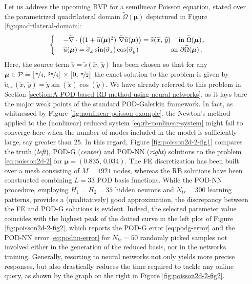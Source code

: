 \documentclass[12pt, a4paper, twoside, openright]{report}
\numberwithin{equation}{chapter}
\theoremstyle{theorem}
\theoremstyle{definition}
\theoremstyle{remark}
\theoremstyle{proposition}
\numberwithin{figure}{chapter}
\newcommand{\wt}[1]{\widetilde{#1}}
\newcommand{\bg}[1]{\boldsymbol{#1}}
\begin{document}
		Let us address the upcoming BVP for a semilinear Poisson equation, stated over the parametrized quadrilateral domain $\wt{\Omega}(\bg{\mu})$ depictured in Figure \ref{fig:quadrilateral-domain}: 
		\begin{equation}
			\label{eq:poisson2d-2}
			\begin{cases}
				& - \wt{\nabla} \cdot \big( (1 + \wt{u}(\bg{\mu})^2) ~ \wt{\nabla} \wt{u}(\bg{\mu}) \big) = \wt{s}(\wt{x}, \, \wt{y}) \hspace*{0.4cm} \text{in $\wt{\Omega}(\bg{\mu})$} \, , \\
				& \wt{u}(\bg{\mu}) = \wt{\sigma}_x \sin(\wt{\sigma}_x) \cos(\wt{\sigma}_y) \hspace*{1.65cm} \text{on $\partial \wt{\Omega}(\bg{\mu})$} \, .
			\end{cases}
		\end{equation}
		Here, the source term $\wt{s} = \wt{s}(\wt{x}, \, \wt{y})$ has been chosen so that for any $\bg{\mu} \in \mathcal{P} = \big[ \nicefrac{\pi}{4}, \, \nicefrac{3 \pi}{4} \big] \times \big[ 0, \, \nicefrac{\pi}{2} \big]$ the exact solution to the problem is given by $\wt{u}_{ex}(\wt{x}, \, \wt{y}) = \wt{y} \sin(\wt{x}) \cos(\wt{y})$. We have already referred to this problem in Section \ref{section:A POD-based RB method using neural networks}, as it lays bare the major weak points of the standard POD-Galerkin framework. In fact, as whitnessed by Figure \ref{fig:nonlinear-poisson-example}, the Newton's method applied to the (nonlinear) reduced system \eqref{eq:rb-nonlinear-system} might fail to converge here when the number of modes included in the model is sufficiently large, say greater than $25$. In this regard, Figure \ref{fig:poisson2d-2-fig1} compares the truth (\emph{left}), POD-G (\emph{center}) and POD-NN (\emph{right}) solutions to the problem \eqref{eq:poisson2d-2} for $\bg{\mu} = (0.835, \, 0.034)$. The FE discretization has been built over a mesh consisting of $M = 1921$ nodes, whereas the RB solutions have been constructed combining $L = 33$ POD basis functions. While the POD-NN procedure, employing $H_1 = H_2 = 35$ hidden neurons and $N_{tr} = 300$ learning patterns, provides a (qualitatively) good approximation, the discrepancy between the FE and POD-G solutions is evident. Indeed, the selected paremeter value coincides with the highest peak of the dotted curve in the left plot of Figure \ref{fig:poisson2d-2-fig2}, which reports the POD-G error \eqref{eq:podg-error} and the POD-NN error \eqref{eq:podnn-error} for $N_{te} = 50$ randomly picked samples not involved either in the generation of the reduced basis, nor in the networks training. Generally, resorting to neural networks not only yields more precise responses, but also drastically reduces the time required to tackle any online query, as shown by the graph on the right in Figure \ref{fig:poisson2d-2-fig2}.
		
\end{document}

